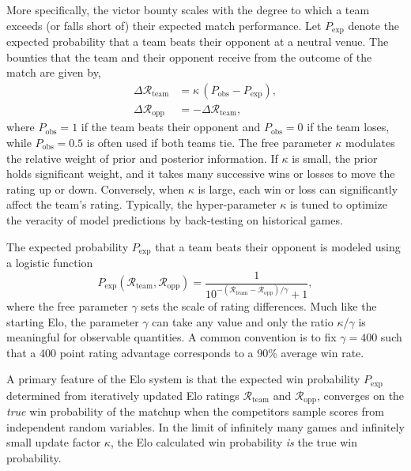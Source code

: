 \documentclass[aps,prc,reprint,amsmath,superscriptaddress]{revtex4-1}
\newcommand{\R}{\mathcal{R}}
\begin{document}
More specifically, the victor bounty scales with the degree to which a team exceeds (or falls short of) their expected match performance.
Let $P_\text{exp}$ denote the expected probability that a team beats their opponent at a neutral venue.
The bounties that the team and their opponent receive from the outcome of the match are given by,
\begin{align}
  \label{elo}
  \Delta \R_\text{team} &= \kappa \,(P_\text{obs} - P_\text{exp}),\\
  \Delta \R_\text{opp} &= -\Delta \R_\text{team},
\end{align}
where ${P_\text{obs}=1}$ if the team beats their opponent and ${P_\text{obs}=0}$ if the team loses, while $P_\text{obs}=0.5$ is often used if both teams tie.
The free parameter $\kappa$ modulates the relative weight of prior and posterior information. 
If $\kappa$ is small, the prior holds significant weight, and it takes many successive wins or losses to move the rating up or down.
Conversely, when $\kappa$ is large, each win or loss can significantly affect the team's rating.
Typically, the hyper-parameter $\kappa$ is tuned to optimize the veracity of model predictions by back-testing on historical games.

The expected probability $P_\text{exp}$ that a team beats their opponent is modeled using a logistic function
\begin{equation}
  \label{win_prob}
  P_\text{exp}(\R_\text{team}, \R_\text{opp}) = \frac{1}{10^{-(\R_\text{team} - \R_\text{opp})/\gamma} +1},
\end{equation}
where the free parameter $\gamma$ sets the scale of rating differences.
Much like the starting Elo, the parameter $\gamma$ can take any value and only the ratio $\kappa/\gamma$ is meaningful for observable quantities.
A common convention is to fix $\gamma=400$ such that a 400 point rating advantage corresponds to a 90\% average win rate.

A primary feature of the Elo system is that the expected win probability $P_\text{exp}$ determined from iteratively updated Elo ratings $\R_\text{team}$ and $\R_\text{opp}$, converges on the \emph{true} win probability of the matchup when the competitors sample scores from independent random variables.
In the limit of infinitely many games and infinitely small update factor $\kappa$, the Elo calculated win probability \emph{is} the true win probability.
\end{document}
